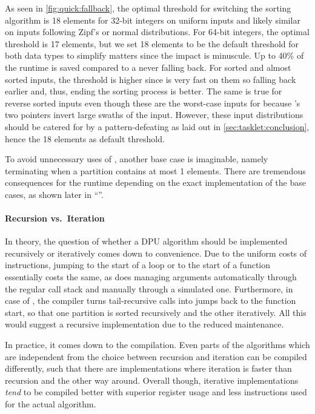 As seen in \cref{fig:quick:fallback}, the optimal threshold for switching the sorting algorithm is 18 elements for 32-bit integers on uniform inputs and likely similar on inputs following Zipf's or normal distributions.
For 64-bit integers, the optimal threshold is 17 elements, but we set 18 elements to be the default threshold for both data types to simplify matters since the impact is minuscule.
Up to 40\% of the runtime is saved compared to a \QS{} never falling back.
For sorted and almost sorted inputs, the threshold is higher since \IS{} is very fast on them so falling back earlier and, thus, ending the sorting process is better.
The same is true for reverse sorted inputs even though these are the worst-case inputs for \IS{} because \QS{}'s two pointers invert large swaths of the input.
However, these input distributions should be catered for by a pattern-defeating \QS{} as laid out in \cref{sec:tasklet:conclusion}, hence the 18 elements as default threshold.

To avoid unnecessary uses of \IS{}, another base case is imaginable, namely terminating when a partition contains at most 1 elements.
There are tremendous consequences for the runtime depending on the exact implementation of the base cases, as shown later in \enquote{}.


\paragraph{Recursion vs.\ Iteration}
In theory, the question of whether a DPU algorithm should be implemented recursively or iteratively comes down to convenience.
Due to the uniform costs of instructions, jumping to the start of a loop or to the start of a function essentially costs the same, as does managing arguments automatically through the regular call stack and manually through a simulated one.
Furthermore, in case of \QS{}, the compiler turns tail-recursive calls into jumps back to the function start, so that one partition is sorted recursively and the other iteratively.
All this would suggest a recursive implementation due to the reduced maintenance.

In practice, it comes down to the compilation.
Even parts of the algorithms which are independent from the choice between recursion and iteration can be compiled differently, such that there are implementations where iteration is faster than recursion and the other way around.
Overall though, iterative implementations \emph{tend} to be compiled better with superior register usage and less instructions used for the actual \QS{} algorithm.


